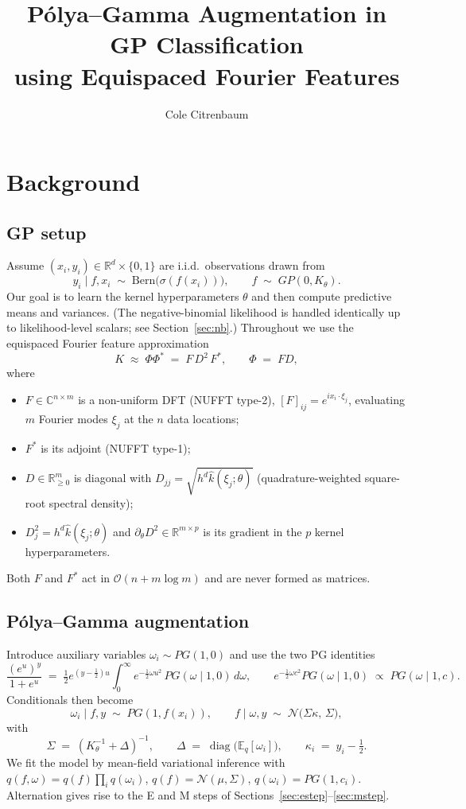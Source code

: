 \documentclass{article}
\title{Pólya--Gamma Augmentation in GP Classification\\using Equispaced Fourier Features}
\author{Cole Citrenbaum}
\date{}
\newcommand{\R}{\mathbb{R}}
\newcommand{\C}{\mathbb{C}}
\newcommand{\E}{\mathbb{E}}
\newcommand{\calO}{\mathcal{O}}
\DeclareMathOperator{\diag}{diag}
\begin{document}
\maketitle
\tableofcontents

\section{Background}
\label{sec:background}

\subsection{GP setup}
Assume $(x_i,y_i)\in\R^d\times\{0,1\}$ are i.i.d.\ observations drawn from
\[
  y_i \mid f, x_i \;\sim\; \mathrm{Bern}\!\bigl(\sigma(f(x_i))\bigr),
  \qquad
  f \;\sim\; GP(0, K_\theta).
\]
Our goal is to learn the kernel hyperparameters $\theta$ and then compute predictive means and variances. (The negative-binomial likelihood is handled identically up to likelihood-level scalars; see Section~\ref{sec:nb}.) Throughout we use the equispaced Fourier feature approximation
\[
  K \;\approx\; \Phi\Phi^{*} \;=\; F\,D^{2}\,F^{*},
  \qquad \Phi \;=\; FD,
\]
where
\begin{itemize}[leftmargin=1.4em,itemsep=1pt]
  \item $F\in\C^{n\times m}$ is a non-uniform DFT (NUFFT type-2), $[F]_{ij}=e^{i x_i\cdot\xi_j}$, evaluating $m$ Fourier modes $\xi_j$ at the $n$ data locations;
  \item $F^{*}$ is its adjoint (NUFFT type-1);
  \item $D\in\R^{m}_{\ge 0}$ is diagonal with $D_{jj}=\sqrt{h^{d}\hat k(\xi_j;\theta)}$ (quadrature-weighted square-root spectral density);
  \item $D^{2}_j=h^{d}\hat k(\xi_j;\theta)$ and $\partial_\theta D^{2}\in\R^{m\times p}$ is its gradient in the $p$ kernel hyperparameters.
\end{itemize}
Both $F$ and $F^{*}$ act in $\calO(n+m\log m)$ and are never formed as matrices.

\subsection{Pólya--Gamma augmentation}
Introduce auxiliary variables $\omega_i\sim PG(1,0)$ and use the two PG identities
\[
  \frac{(e^{u})^{y}}{1+e^{u}}
  \;=\;
  \tfrac12 e^{(y-\frac12)u}\!
  \int_0^{\infty}\!e^{-\frac12\omega u^{2}}\,PG(\omega\mid 1,0)\,d\omega,
  \qquad
  e^{-\frac12\omega c^{2}}PG(\omega\mid 1,0)\;\propto\;PG(\omega\mid 1,c).
\]
Conditionals then become
\[
  \omega_i\mid f,y \;\sim\; PG(1,f(x_i)),
  \qquad
  f\mid\omega,y \;\sim\; \mathcal{N}\!\bigl(\Sigma\kappa,\,\Sigma\bigr),
\]
with
\[
  \Sigma \;=\; (K_\theta^{-1}+\Delta)^{-1},
  \qquad
  \Delta \;=\; \diag\!\bigl(\E_q[\omega_i]\bigr),
  \qquad
  \kappa_i \;=\; y_i - \tfrac12.
\]
We fit the model by mean-field variational inference with $q(f,\omega)=q(f)\prod_i q(\omega_i)$, $q(f)=\mathcal{N}(\mu,\Sigma)$, $q(\omega_i)=PG(1,c_i)$. Alternation gives rise to the E and M steps of Sections~\ref{sec:estep}--\ref{sec:mstep}.
\end{document}

